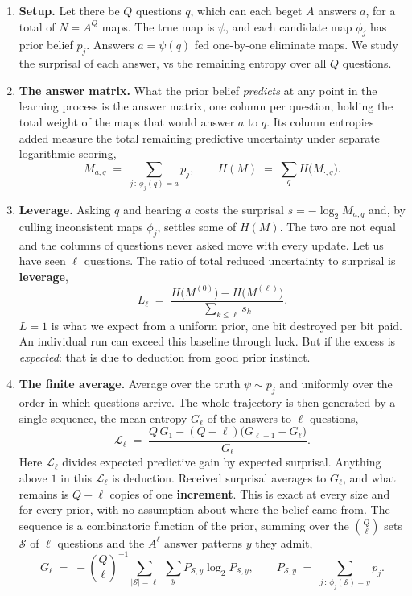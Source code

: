 \documentclass[11pt]{article}
\begin{document}
\begin{enumerate}
\item \textbf{Setup.} Let there be $Q$ questions $q$, which can each beget $A$ answers $a$,
for a total of $N = A^Q$ maps. The true map is $\psi$, and each candidate map $\phi_j$
has prior belief $p_j$. Answers $a=\psi(q)$ fed one-by-one eliminate maps. We study
the surprisal of each answer, vs the remaining entropy over all $Q$ questions.

\item \textbf{The answer matrix.} What the prior belief \emph{predicts} at any point in the 
learning process is the answer matrix, one column per question, holding the total weight
of the maps that would answer $a$ to $q$. Its column entropies added
measure the total remaining predictive uncertainty under separate logarithmic scoring,
%
\[
  M_{a,q} \;=\; \sum_{j\,:\,\phi_j(q) = a} p_j,
  \qquad
  H(M) \;=\; \sum_q H\big(M_{\cdot,q}\big).
\]

\item \textbf{Leverage.} Asking $q$ and hearing $a$ costs the surprisal
$s = -\log_2 M_{a,q}$ and, by culling inconsistent maps $\phi_j$, settles some of $H(M)$. 
The two are not equal and the columns of questions never asked move with every update. 
Let us have seen $\ell$ questions. The ratio of total reduced uncertainty to surprisal is \textbf{leverage},
%
\[
  L_\ell \;=\;
  \frac{H\big(M^{(0)}\big) - H\big(M^{(\ell)}\big)}
       {\sum_{k \le \ell} s_k} .
\]
%
$L = 1$ is what we expect from a uniform prior, one bit destroyed per bit paid.
An individual run can exceed this baseline through luck. But if the excess is \emph{expected}: that is due to deduction from good prior instinct.

\item \textbf{The finite average.} Average over the truth $\psi \sim p_j$ and uniformly 
over the order in which questions arrive. 
The whole trajectory is then generated by a
single sequence, the mean entropy $G_\ell$ of the answers to $\ell$
questions,
%
\[
  \mathcal L_\ell
  \;=\; \frac{Q\,G_1 - (Q-\ell)\big(G_{\ell+1} - G_\ell\big)}{G_\ell} .
\]
%
Here $\mathcal L_\ell$ divides expected predictive gain by expected
surprisal. Anything above $1$ in this $\mathcal L_\ell$ is deduction.
Received surprisal averages to $G_\ell$, and what remains is $Q-\ell$ copies of one
\textbf{increment}. This is exact at every size and for every prior, with no
assumption about where the belief came from. The sequence is a combinatoric function 
of the prior, summing over the $\binom Q\ell$ sets $\mathcal S$ of
$\ell$ questions and the $A^\ell$ answer patterns $y$ they admit,
%
\[
  G_\ell \;=\; -\binom{Q}{\ell}^{-1} \sum_{|\mathcal S| = \ell}\;
  \sum_{y} P_{\mathcal S,y}\log_2 P_{\mathcal S,y},
  \qquad
  P_{\mathcal S,y} \;=\; \sum_{j\,:\,\phi_j(\mathcal S) = y} p_j .
\]


\end{enumerate}
\end{document}

